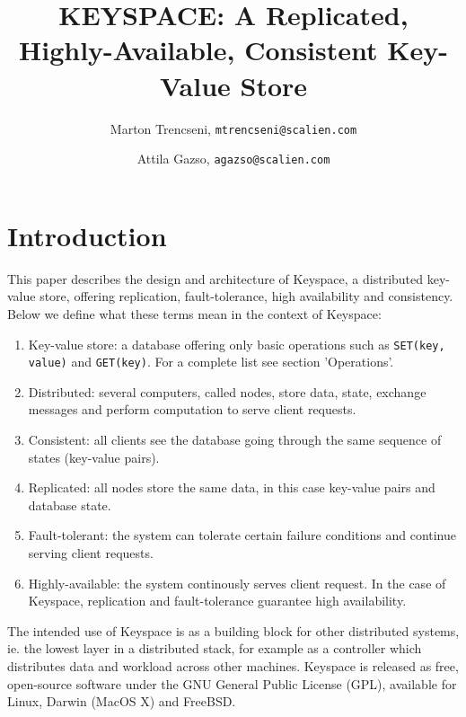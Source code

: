 \documentclass[12pt]{article}
\title{ KEYSPACE: A Replicated, Highly-Available, Consistent Key-Value Store }
\author{ Marton Trencseni, \texttt{mtrencseni@scalien.com} \and Attila Gazso, \texttt{agazso@scalien.com} }
\date{}
\begin{document}
\maketitle


\section{ Introduction }

This paper describes the design and architecture of Keyspace, a distributed key-value store, offering replication, fault-tolerance, high availability and consistency. Below we define what these terms mean in the context of Keyspace:

\begin{enumerate}
\item Key-value store: a database offering only basic operations such as \texttt{SET(key, value)} and \texttt{GET(key)}. For a complete list see section 'Operations'.
\item Distributed: several computers, called nodes, store data, state, exchange messages and perform computation to serve client requests.
\item Consistent: all clients see the database going through the same sequence of states (key-value pairs).
\item Replicated: all nodes store the same data, in this case key-value pairs and database state.
\item Fault-tolerant: the system can tolerate certain failure conditions and continue serving client requests.
\item Highly-available: the system continously serves client request. In the case of Keyspace, replication and fault-tolerance guarantee high availability.
\end{enumerate}

The intended use of Keyspace is as a building block for other distributed systems, ie. the lowest layer in a distributed stack, for example as a controller which distributes data and workload across other machines. Keyspace is released as free, open-source software under the GNU General Public License (GPL), available for Linux, Darwin (MacOS X) and FreeBSD.
\end{document}
